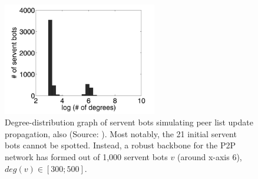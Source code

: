 \documentclass{llncs}
\begin{document}
\begin{figure}[htbp]
  \centering
  
    \includegraphics[width=0.6\textwidth]{figures/distributiongraph2.png}
  
  \caption{Degree-distribution graph of servent bots simulating peer list update propagation, also (Source: \cite{td1sc}). Most notably, the 21 initial servent bots cannot be spotted. Instead, a robust backbone for the P2P network has formed out of 1,000 servent bots $v$ (around x-axis 6), $deg(v) \in [300;500]$.}
  \label{distributiongraph2}
\end{figure}
\end{document}

